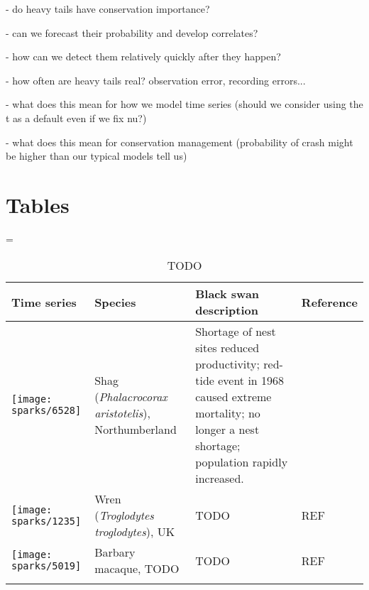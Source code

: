\documentclass[10pt]{article}
\begin{document}
- do heavy tails have conservation importance?

- can we forecast their probability and develop correlates?

- how can we detect them relatively quickly after they happen?

- how often are heavy tails real? observation error, recording errors...

- what does this mean for how we model time series (should we consider using the t as a default even if we fix nu?)

- what does this mean for conservation management (probability of crash  might be higher than our typical models tell us)



\clearpage

\section{Tables}


\LTcapwidth=\textwidth
{}

\begin{small}
\begin{longtable}{>{\RaggedRight}m{2.0cm}>{\RaggedRight}p{3.0cm}>{\RaggedRight}p{7.0cm}>{\RaggedRight}p{2.0cm}}

\caption{TODO}\\

\toprule
Time series & Species & Black swan description & Reference \\
\midrule

\texttt{[image: sparks/6528]} &
Shag (\textit{Phalacrocorax aristotelis}), Northumberland &
Shortage of nest sites reduced productivity; red-tide event in 1968 caused extreme mortality; no longer a nest shortage; population rapidly increased. &
\citep{potts1980}\\



\texttt{[image: sparks/1235]} &
Wren (\textit{Troglodytes troglodytes}), UK &
TODO &
REF \\


\texttt{[image: sparks/5019]} &
Barbary macaque, TODO &
TODO &
REF\\

\bottomrule
\label{tab:sparks}
\end{longtable}
\end{small}
\end{document}
